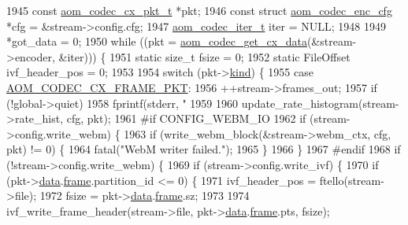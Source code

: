 \begin{DoxyCodeInclude}
{{{{{{{{{{{{{{{{{{{{{{{{{{{{{{{{{{{{{1945   \textcolor{keyword}{const} \hyperlink{structaom__codec__cx__pkt}{aom\_codec\_cx\_pkt\_t} *pkt;
1946   \textcolor{keyword}{const} \textcolor{keyword}{struct }\hyperlink{structaom__codec__enc__cfg}{aom\_codec\_enc\_cfg} *cfg = &stream->config.cfg;
1947   \hyperlink{group__codec_gadf9e173c9e02788a9999399edab20a02}{aom\_codec\_iter\_t} iter = NULL;
1948 
1949   *got\_data = 0;
1950   \textcolor{keywordflow}{while} ((pkt = \hyperlink{group__encoder_gaedc4c56b60d4217677cb561066360884}{aom\_codec\_get\_cx\_data}(&stream->encoder, &iter))) \{
1951     \textcolor{keyword}{static} \textcolor{keywordtype}{size\_t} fsize = 0;
1952     \textcolor{keyword}{static} FileOffset ivf\_header\_pos = 0;
1953 
1954     \textcolor{keywordflow}{switch} (pkt->\hyperlink{structaom__codec__cx__pkt_a11e586120c689ece9a7690e72ff384be}{kind}) \{
1955       \textcolor{keywordflow}{case} \hyperlink{group__encoder_ggafeb69da4a9649a54e805f59c26d8dfeda793165d0f219812342f69d5fd9b2b9c8}{AOM\_CODEC\_CX\_FRAME\_PKT}:
1956         ++stream->frames\_out;
1957         \textcolor{keywordflow}{if} (!global->quiet)
1958           fprintf(stderr, \textcolor{stringliteral}{" %
1959 
1960         update\_rate\_histogram(stream->rate\_hist, cfg, pkt);
1961 \textcolor{preprocessor}{#if CONFIG\_WEBM\_IO}
1962         \textcolor{keywordflow}{if} (stream->config.write\_webm) \{
1963           \textcolor{keywordflow}{if} (write\_webm\_block(&stream->webm\_ctx, cfg, pkt) != 0) \{
1964             fatal(\textcolor{stringliteral}{"WebM writer failed."});
1965           \}
1966         \}
1967 \textcolor{preprocessor}{#endif}
1968         \textcolor{keywordflow}{if} (!stream->config.write\_webm) \{
1969           \textcolor{keywordflow}{if} (stream->config.write\_ivf) \{
1970             \textcolor{keywordflow}{if} (pkt->\hyperlink{structaom__codec__cx__pkt_afb379cd4bfa7692d1d6e85f4e4b2b410}{data}.\hyperlink{structaom__codec__cx__pkt_a4180a6ae59b0d295bc915d4689df4cb0}{frame}.partition\_id <= 0) \{
1971               ivf\_header\_pos = ftello(stream->file);
1972               fsize = pkt->\hyperlink{structaom__codec__cx__pkt_afb379cd4bfa7692d1d6e85f4e4b2b410}{data}.\hyperlink{structaom__codec__cx__pkt_a4180a6ae59b0d295bc915d4689df4cb0}{frame}.sz;
1973 
1974               ivf\_write\_frame\_header(stream->file, pkt->\hyperlink{structaom__codec__cx__pkt_afb379cd4bfa7692d1d6e85f4e4b2b410}{data}.\hyperlink{structaom__codec__cx__pkt_a4180a6ae59b0d295bc915d4689df4cb0}{frame}.pts, fsize);
}}}}}}}}}}}}}}}}}}}}}}}}}}}}}}}}}}}}}}
\end{DoxyCodeInclude}
